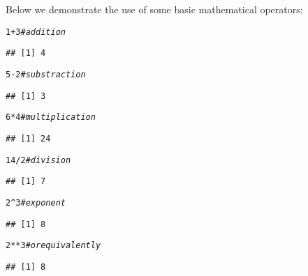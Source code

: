 \documentclass[12pt,a4paper]{scrartcl}\usepackage[]{graphicx}\usepackage[]{color}
\makeatletter
\newcommand{\hlnum}[1]{\textcolor[rgb]{0.686,0.059,0.569}{#1}}%
\newcommand{\hlcom}[1]{\textcolor[rgb]{0.678,0.584,0.686}{\textit{#1}}}%
\newcommand{\hlopt}[1]{\textcolor[rgb]{0,0,0}{#1}}%
\newenvironment{kframe}{%
 \def\at@end@of@kframe{}%
 \ifinner\ifhmode%
  \def\at@end@of@kframe{\end{minipage}}%
  \begin{minipage}{\columnwidth}%
 \fi\fi%
 \def\FrameCommand##1{\hskip\@totalleftmargin \hskip-\fboxsep
 \colorbox{shadecolor}{##1}\hskip-\fboxsep
     \hskip-\linewidth \hskip-\@totalleftmargin \hskip\columnwidth}%
 \MakeFramed {\advance\hsize-\width
   \@totalleftmargin\z@ \linewidth\hsize
   \@setminipage}}%
 {\par\unskip\endMakeFramed%
 \at@end@of@kframe}
\newenvironment{knitrout}{}{} %
\makeatother
\begin{document}
Below we demonstrate the use of some basic mathematical operators:
\begin{knitrout}
\color{fgcolor}\begin{kframe}
\begin{alltt}
\hlnum{1}\hlopt{+}\hlnum{3} \hlcom{#addition}
\end{alltt}
\begin{verbatim}
## [1] 4
\end{verbatim}
\begin{alltt}
\hlnum{5}\hlopt{-}\hlnum{2} \hlcom{#substraction}
\end{alltt}
\begin{verbatim}
## [1] 3
\end{verbatim}
\begin{alltt}
\hlnum{6}\hlopt{*}\hlnum{4} \hlcom{#multiplication}
\end{alltt}
\begin{verbatim}
## [1] 24
\end{verbatim}
\begin{alltt}
\hlnum{14}\hlopt{/}\hlnum{2} \hlcom{#division}
\end{alltt}
\begin{verbatim}
## [1] 7
\end{verbatim}
\begin{alltt}
\hlnum{2}\hlopt{^}\hlnum{3} \hlcom{#exponent}
\end{alltt}
\begin{verbatim}
## [1] 8
\end{verbatim}
\begin{alltt}
\hlnum{2}\hlopt{**}\hlnum{3} \hlcom{#or equivalently}
\end{alltt}
\begin{verbatim}
## [1] 8
\end{verbatim}
\end{kframe}
\end{knitrout}
\end{document}
